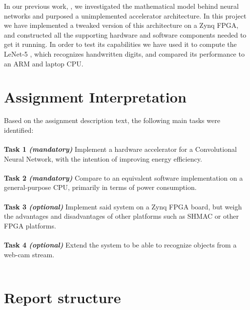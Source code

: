 In our previous work, \cite{Halvorsen2014}, we investigated the mathematical model behind neural networks and purposed a unimplemented accelerator architecture. In this project we have implemented a tweaked version of this architecture on a Zynq FPGA, and constructed all the supporting hardware and software components needed to get it running. In order to test its capabilities we have used it to compute the LeNet-5 \cite{LeCun1998}, which recognizes handwritten digits, and compared its performance to an ARM and laptop CPU.


\section{Assignment Interpretation}

Based on the assignment description text, the following main tasks were
identified:\\ \hfil \\ \hfil
\textbf{Task 1 \textit{(mandatory)}} Implement a hardware accelerator for a Convolutional Neural Network, with the intention of improving energy efficiency.  \\ \hfil \\ \hfil
\textbf{Task 2 \textit{(mandatory)}} Compare to an equivalent software implementation on a general-purpose CPU, primarily in terms of power consumption.  \\ \hfil \\ \hfil
\textbf{Task 3 \textit{(optional)}} Implement said system on a  Zynq FPGA board, but weigh the advantages and disadvantages of other platforms such as SHMAC or other FPGA platforms. \\ \hfil \\ \hfil
\textbf{Task 4 \textit{(optional)}} Extend the system to be able to recognize objects from a web-cam stream. \\ \hfil \\ \hfil


\section{Report structure}

